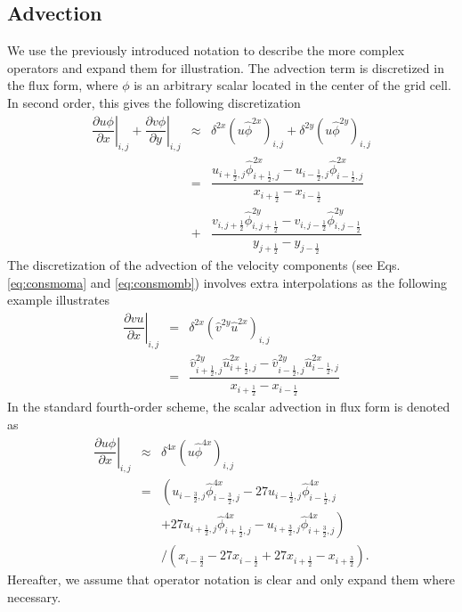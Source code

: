 \documentclass[gmd]{copernicus}
\begin{document}
\subsection{Advection}
We use the previously introduced notation to describe the more complex operators and expand them for illustration. The advection term is discretized in the flux form, where $\phi$ is an arbitrary scalar located in the center of the grid cell. In second order, this gives the following discretization
\begin{eqnarray}
\nonumber
\left. \dfrac{\partial u \phi}{\partial x}\right|_{i,j} + \left. \dfrac{\partial v \phi}{\partial y} \right|_{i,j} & \approx & 
\delta^{2x} \left( u \widehat{\phi}^{2x} \right)_{i,j} + \delta^{2y} \left( u \widehat{\phi}^{2y} \right)_{i,j} \\ 
& = & \dfrac{ u_{i+\frac{1}{2},j} \widehat{\phi}^{2x}_{i+\frac{1}{2},j} - u_{i-\frac{1}{2},j} \widehat{\phi}^{2x}_{i-\frac{1}{2},j} }
            { x_{i+\frac{1}{2}} - x_{i-\frac{1}{2}} }\\
& + & \dfrac{ v_{i,j+\frac{1}{2}} \widehat{\phi}^{2y}_{i,j+\frac{1}{2}} - v_{i,j-\frac{1}{2}} \widehat{\phi}^{2y}_{i,j-\frac{1}{2}} }
            { y_{j+\frac{1}{2}} - y_{j-\frac{1}{2}} }
\end{eqnarray}
The discretization of the advection of the velocity components (see Eqs. \ref{eq:consmoma} and \ref{eq:consmomb}) involves extra interpolations as the following example illustrates
\begin{eqnarray}
\left. \dfrac{\partial v u}{\partial x} \right|_{i,j} & = & \delta^{2x} \left( \widehat{v}^{2y} \widehat{u}^{2x} \right)_{i,j} \\
& = & \dfrac{ \widehat{v}^{2y}_{i+\frac{1}{2},j} \widehat{u}^{2x}_{i+\frac{1}{2},j} - \widehat{v}^{2y}_{i-\frac{1}{2},j} \widehat{u}^{2x}_{i-\frac{1}{2},j} }
      { x_{i+\frac{1}{2}} - x_{i-\frac{1}{2}} }\label{eq:advec2u}
\end{eqnarray}
In the standard fourth-order scheme, the scalar advection in flux form is denoted as
\begin{eqnarray}
\nonumber
\left. \dfrac{\partial u \phi}{\partial x} \right|_{i,j} & \approx & \delta^{4x} \left( u \widehat{\phi}^{4x} \right)_{i,j} \\
\nonumber
& = & \left( u_{i-\frac{3}{2},j} \widehat{\phi}^{4x}_{i-\frac{3}{2},j} - 27 u_{i-\frac{1}{2},j} \widehat{\phi}^{4x}_{i-\frac{1}{2},j} \right.\\
\nonumber
&   &\left. + 27 u_{i+\frac{1}{2},j} \widehat{\phi}^{4x}_{i+\frac{1}{2},j} - u_{i+\frac{3}{2},j} \widehat{\phi}^{4x}_{i+\frac{3}{2},j} \right)\\
&   &\slash \left( x_{i-\frac{3}{2}} - 27 x_{i-\frac{1}{2}} + 27 x_{i+\frac{1}{2}} - x_{i+\frac{3}{2}} \right).
\end{eqnarray}
Hereafter, we assume that operator notation is clear and only expand them where necessary.
\end{document}
